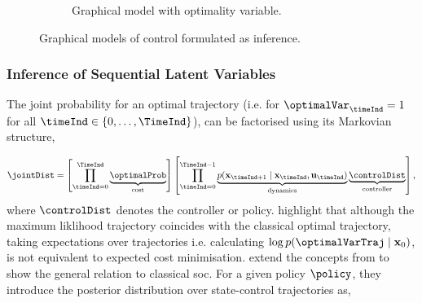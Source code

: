 \documentclass{mimosis-class/mimosis}
\numberwithin{equation}{chapter}
\newcommand{\state}{\ensuremath{\mathbf{x}}}
\newcommand{\control}{\ensuremath{\mathbf{u}}}
\begin{document}
{\begin{figure}[t]
\begin{subfigure}{.48\textwidth}
{
    }
  \caption{Graphical model with optimality variable.}
\label{fig-augmented-control-graphical-model}
\end{subfigure}
\caption[Graphical models of control formulated as inference]{Graphical models of control formulated as inference.}
\label{fig-control-graphical-model}
\end{figure}

\subsubsection{Inference of Sequential Latent Variables}
\label{sec:org8a145c4}
\newline

The joint probability for an optimal trajectory (i.e.
for \(\optimalVar_\timeInd=1\) for all \(\timeInd \in \{0,\ldots,\TimeInd\}\)),
can be factorised using its Markovian structure,

\small
\begin{align} \label{eq-traj-opt-joint-dist}
\jointDist =
\left[ \prod_{\timeInd=0}^{\TimeInd}
\underbrace{\optimalProb}_{\text{cost}} \right]
\left[ \prod_{\timeInd=0}^{\TimeInd-1}
\underbrace{p(\state_{\timeInd+1} \mid \state_\timeInd, \control_\timeInd)}_{\text{dynamics}}
\underbrace{\controlDist}_{\text{controller}} \right],
\end{align}
\normalsize
where \(\controlDist\) denotes the controller or policy.
\cite{toussaintRobot2009} highlight that although the maximum liklihood trajectory coincides with the classical
optimal trajectory, taking expectations over trajectories
i.e. calculating \(\log p(\optimalVarTraj \mid \state_0)\),
is not equivalent to expected cost minimisation.
\cite{rawlikStochastic2013} extend the concepts from  \cite{toussaintRobot2009} to show the general relation
to classical \acrshort{soc}.
For a given policy \(\policy\), they introduce the posterior distribution over state-control trajectories as,

}
\end{document}
